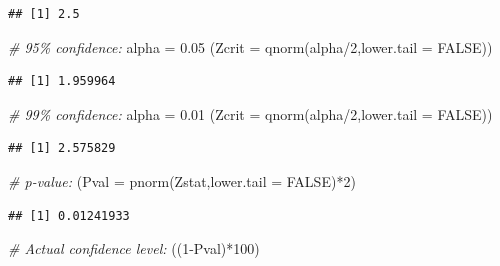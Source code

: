 \documentclass[
]{book}
\newenvironment{Shaded}{\begin{snugshade}}{\end{snugshade}}
\newcommand{\AttributeTok}[1]{\textcolor[rgb]{0.77,0.63,0.00}{#1}}
\newcommand{\CommentTok}[1]{\textcolor[rgb]{0.56,0.35,0.01}{\textit{#1}}}
\newcommand{\ConstantTok}[1]{\textcolor[rgb]{0.00,0.00,0.00}{#1}}
\newcommand{\DecValTok}[1]{\textcolor[rgb]{0.00,0.00,0.81}{#1}}
\newcommand{\FloatTok}[1]{\textcolor[rgb]{0.00,0.00,0.81}{#1}}
\newcommand{\FunctionTok}[1]{\textcolor[rgb]{0.00,0.00,0.00}{#1}}
\newcommand{\NormalTok}[1]{#1}
\newcommand{\OtherTok}[1]{\textcolor[rgb]{0.56,0.35,0.01}{#1}}
\newcommand{\SpecialCharTok}[1]{\textcolor[rgb]{0.00,0.00,0.00}{#1}}
\begin{document}
\begin{verbatim}
## [1] 2.5
\end{verbatim}

\begin{Shaded}
\begin{Highlighting}[]
\CommentTok{\# 95\% confidence:}
\NormalTok{alpha }\OtherTok{=} \FloatTok{0.05}
\NormalTok{(}\AttributeTok{Zcrit =} \FunctionTok{qnorm}\NormalTok{(alpha}\SpecialCharTok{/}\DecValTok{2}\NormalTok{,}\AttributeTok{lower.tail =} \ConstantTok{FALSE}\NormalTok{))}
\end{Highlighting}
\end{Shaded}

\begin{verbatim}
## [1] 1.959964
\end{verbatim}

\begin{Shaded}
\begin{Highlighting}[]
\CommentTok{\# 99\% confidence:}
\NormalTok{alpha }\OtherTok{=} \FloatTok{0.01}
\NormalTok{(}\AttributeTok{Zcrit =} \FunctionTok{qnorm}\NormalTok{(alpha}\SpecialCharTok{/}\DecValTok{2}\NormalTok{,}\AttributeTok{lower.tail =} \ConstantTok{FALSE}\NormalTok{))}
\end{Highlighting}
\end{Shaded}

\begin{verbatim}
## [1] 2.575829
\end{verbatim}

\begin{Shaded}
\begin{Highlighting}[]
\CommentTok{\# p{-}value:}
\NormalTok{(}\AttributeTok{Pval =} \FunctionTok{pnorm}\NormalTok{(Zstat,}\AttributeTok{lower.tail =} \ConstantTok{FALSE}\NormalTok{)}\SpecialCharTok{*}\DecValTok{2}\NormalTok{)}
\end{Highlighting}
\end{Shaded}

\begin{verbatim}
## [1] 0.01241933
\end{verbatim}

\begin{Shaded}
\begin{Highlighting}[]
\CommentTok{\# Actual confidence level:}
\NormalTok{((}\DecValTok{1}\SpecialCharTok{{-}}\NormalTok{Pval)}\SpecialCharTok{*}\DecValTok{100}\NormalTok{)}
\end{Highlighting}
\end{Shaded}
\end{document}
